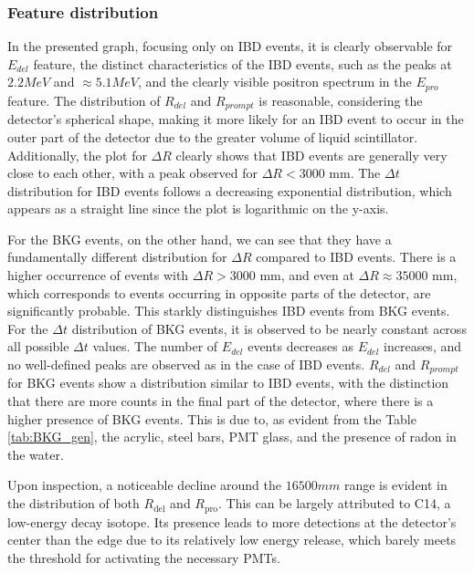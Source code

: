 \subsubsection*{Feature distribution}
In the presented graph, focusing only on IBD events, it is clearly observable for $E_{del}$ feature, the distinct characteristics of the IBD events, such as the peaks at $2.2 MeV$ and $\approx 5.1 MeV$, and the clearly visible positron spectrum in the $E_{pro}$ feature. The distribution of $R_{del}$ and $R_{prompt}$ is reasonable, considering the detector's spherical shape, making it more likely for an IBD event to occur in the outer part of the detector due to the greater volume of liquid scintillator. Additionally, the plot for \( \Delta R \) clearly shows that IBD events are generally very close to each other, with a peak observed for \( \Delta R < 3000 \) mm. The \( \Delta t \) distribution for IBD events follows a decreasing exponential distribution, which appears as a straight line since the plot is logarithmic on the y-axis.

For the BKG events, on the other hand, we can see that they have a fundamentally different distribution for \( \Delta R \) compared to IBD events. There is a higher occurrence of events with \( \Delta R > 3000 \) mm, and even at \( \Delta R \approx 35000 \) mm, which corresponds to events occurring in opposite parts of the detector, are significantly probable. This starkly distinguishes IBD events from BKG events. For the \( \Delta t \) distribution of BKG events, it is observed to be nearly constant across all possible \( \Delta t \) values. The number of \( E_{del} \) events decreases as \( E_{del} \) increases, and no well-defined peaks are observed as in the case of IBD events. \( R_{del} \) and \( R_{prompt} \) for BKG events show a distribution similar to IBD events, with the distinction that there are more counts in the final part of the detector, where there is a higher presence of BKG events. This is due to, as evident from the Table \ref{tab:BKG_gen}, the acrylic, steel bars, PMT glass, and the presence of radon in the water.

Upon inspection, a noticeable decline around the $16500mm$ range is evident in the distribution of both \(R_{\text{del}}\) and \(R_{\text{pro}}\). This can be largely attributed to C14, a low-energy decay isotope. Its presence leads to more detections at the detector's center than the edge due to its relatively low energy release, which barely meets the threshold for activating the necessary PMTs.

